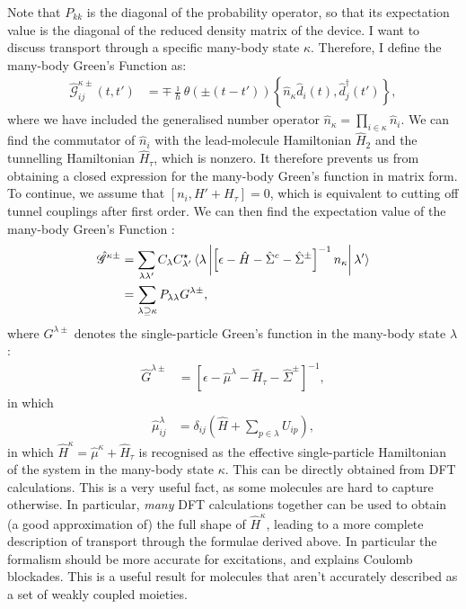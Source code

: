 \documentclass{article}
\begin{document}
\begin{multicols}{2}
        Note that $P_{kk}$ is the diagonal of the probability operator, so that its expectation value is the diagonal of the reduced density matrix of the device. I want to discuss transport through a specific many-body state $\kappa$. Therefore, I define the many-body Green's Function as:
        \begin{align}
        \hat{\mathscr{G}}^{\kappa\pm}_{ij} (t,t') &= \mp \frac{\imath}{\hbar} \theta(\pm(t-t'))\left\{ \hat{n}_\kappa \hat{d}_i(t), \hat{d}_j^\dagger (t')\right\},
        \label{eq:mbgfdef}
        \end{align}
        where we have included the generalised number operator $\hat{n}_\kappa = \prod_{i\in\kappa} \hat{n}_i$. We can find the commutator of $\hat{n}_i$ with the lead-molecule Hamiltonian $\hat{H}_2$ and the tunnelling Hamiltonian $\hat{H}_\tau$, which is nonzero. It therefore prevents us from obtaining a closed expression for the many-body Green's function in matrix form. To continue, we assume that $\left[ n_i, H' + H_\tau \right]=0$, which is equivalent to cutting off tunnel couplings after first order. We can then find the expectation value of the many-body Green's Function :
        \begin{align}               
        \mathscr{\hat{G}}^{\kappa\pm} &= \sum_{\lambda\lambda'} C_\lambda C^\star_{\lambda'} \braket{\lambda \left| \left[ \epsilon-\hat{H} - \hat{\Sigma}^c - \hat{\Sigma}^\pm\right]^{-1} n_\kappa \right| \lambda'} \nonumber \\
        &= \sum_{\lambda\supseteq\kappa} P_{\lambda\lambda} G^{\lambda\pm},\label{eq:mbgfresult}
        \end{align}
        where $G^{\lambda\pm}$ denotes the single-particle Green's function in the many-body state $\lambda$:
        \begin{align*}
        \hat{G}^{\lambda\pm} &= \left[\epsilon - \hat{\mu}^\lambda - \hat{H}_\tau - \hat{\Sigma}^\pm \right]^{-1},
        \end{align*}
        in which
        \begin{align}
        \hat{\mu}^\lambda_{ij} &= \delta_{ij} \left( \hat{H} + \sum_{p\in\lambda} U_{ip} \right) \label{eq:result},
        \end{align}
        in which $\hat{H}^\kappa = \hat{\mu}^\kappa + \hat{H}_\tau$ is recognised as the effective single-particle Hamiltonian of the system in the many-body state $\kappa$. This can be directly obtained from DFT calculations. This is a very useful fact, as some molecules are hard to capture otherwise. In particular, \emph{many} DFT calculations together can be used to obtain (a good approximation of) the full shape of $\hat{H}^\kappa$, leading to a more complete description of transport through the formulae derived above. In particular the formalism should be more accurate for excitations, and explains Coulomb blockades. This is a useful result for molecules that aren't accurately described as a set of weakly coupled moieties.
        

\end{multicols}
\end{document}
